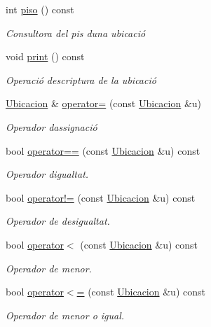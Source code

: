 \begin{DoxyCompactItemize}
int \hyperlink{class_ubicacion_af6099f8de4dee993e4c9119e1f879070}{piso} () const
\begin{DoxyCompactList}\small\item\em Consultora del pis d\textquotesingle{}una ubicació \end{DoxyCompactList}\item 
void \hyperlink{class_ubicacion_a6b693a32d8bbd9afce30b11d19b68846}{print} () const
\begin{DoxyCompactList}\small\item\em Operació d\textquotesingle{}escriptura de la ubicació \end{DoxyCompactList}\item 
\hyperlink{class_ubicacion}{Ubicacion} \& \hyperlink{class_ubicacion_ac88191686dfc11998ec6688828b52b9f}{operator=} (const \hyperlink{class_ubicacion}{Ubicacion} \&u)
\begin{DoxyCompactList}\small\item\em Operador d\textquotesingle{}assignació \end{DoxyCompactList}\item 
bool \hyperlink{class_ubicacion_a4fd8b3d7d42695cc4852771e34ab63bc}{operator==} (const \hyperlink{class_ubicacion}{Ubicacion} \&u) const
\begin{DoxyCompactList}\small\item\em Operador d\textquotesingle{}igualtat. \end{DoxyCompactList}\item 
bool \hyperlink{class_ubicacion_a5caac27fa52a8e5fddd5ab50b0d56bd1}{operator!=} (const \hyperlink{class_ubicacion}{Ubicacion} \&u) const
\begin{DoxyCompactList}\small\item\em Operador de desigualtat. \end{DoxyCompactList}\item 
bool \hyperlink{class_ubicacion_a4d19b7ea907107a1c25677c3785a0a69}{operator$<$} (const \hyperlink{class_ubicacion}{Ubicacion} \&u) const
\begin{DoxyCompactList}\small\item\em Operador de menor. \end{DoxyCompactList}\item 
bool \hyperlink{class_ubicacion_ac3b54c312d4e2e01c6bda1205b39ae3b}{operator$<$=} (const \hyperlink{class_ubicacion}{Ubicacion} \&u) const
\begin{DoxyCompactList}\small\item\em Operador de menor o igual. \end{DoxyCompactList}\item 

\end{DoxyCompactItemize}
